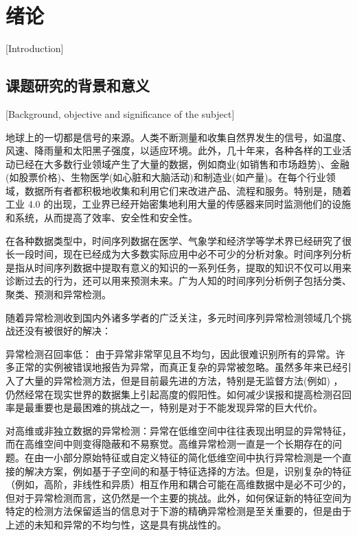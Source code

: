 
\chapter{绪论}[Introduction]

\section{课题研究的背景和意义}[Background, objective and significance of the subject]

地球上的一切都是信号的来源。人类不断测量和收集自然界发生的信号，如温度、风速、降雨量和太阳黑子强度，以适应环境。此外，几十年来，各种各样的工业活动已经在大多数行业领域产生了大量的数据，例如商业(如销售和市场趋势)、金融(如股票价格)、生物医学(如心脏和大脑活动)和制造业(如产量)。在每个行业领域，数据所有者都积极地收集和利用它们来改进产品、流程和服务。特别是，随着工业 4.0 的出现，工业界已经开始密集地利用大量的传感器来同时监测他们的设施和系统，从而提高了效率、安全性和安全性\cite{yellow1}。

在各种数据类型中，时间序列数据在医学、气象学和经济学等学术界已经研究了很长一段时间，现在已经成为大多数实际应用中必不可少的分析对象。时间序列分析是指从时间序列数据中提取有意义的知识的一系列任务，提取的知识不仅可以用来诊断过去的行为，还可以用来预测未来。广为人知的时间序列分析例子包括分类、聚类、预测和异常检测。

随着异常检测收到国内外诸多学者的广泛关注\cite{none5, none4, none3, none2, none1}，多元时间序列异常检测领域几个挑战还没有被很好的解决：

异常检测召回率低： 由于异常非常罕见且不均匀，因此很难识别所有的异常。许多正常的实例被错误地报告为异常，而真正复杂的异常被忽略。虽然多年来已经引入了大量的异常检测方法，但是目前最先进的方法，特别是无监督方法(例如\cite{orange17,orange84}) ，仍然经常在现实世界的数据集上引起高度的假阳性\cite{orange20,orange115}。如何减少误报和提高检测召回率是最重要也是最困难的挑战之一，特别是对于不能发现异常的巨大代价。

对高维或非独立数据的异常检测：异常在低维空间中往往表现出明显的异常特征，而在高维空间中则变得隐蔽和不易察觉。高维异常检测一直是一个长期存在的问题。在由一小部分原始特征或自定义特征的简化低维空间中执行异常检测是一个直接的解决方案，例如基于子空间的\cite{orange70,orange77,orange84,orange123}和基于特征选择的方法\cite{orange12,orange109,orange111}。但是，识别复杂的特征（例如，高阶，非线性和异质）相互作用和耦合\cite{orange22}可能在高维数据中是必不可少的，但对于异常检测而言，这仍然是一个主要的挑战。此外，如何保证新的特征空间为特定的检测方法保留适当的信息对于下游的精确异常检测是至关重要的，但是由于上述的未知和异常的不均匀性，这是具有挑战性的。
 

